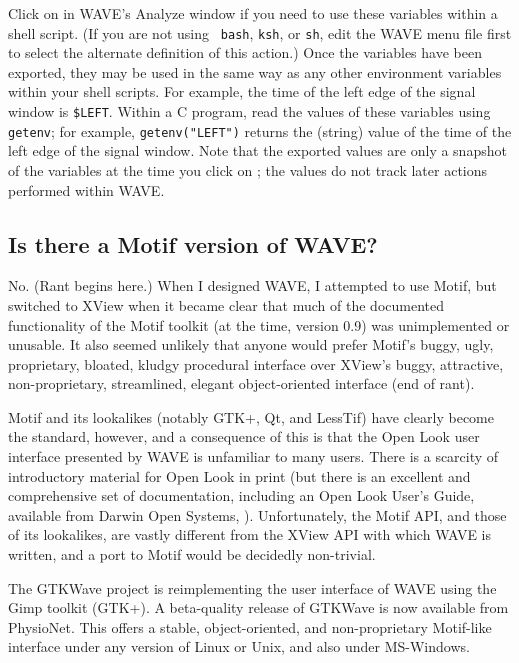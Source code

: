 \documentclass[twoside]{book}
\newcommand{\button}[1]{\cornersize{2}\ovalbox{\rule[-.3mm]{0cm}{2.5mm}\small\sf ~#1~}}
\newcommand{\WAVE}{{\sf WAVE}\xspace}
\begin{document}
Click on \button{Export variables} in \WAVE{}'s {\sf Analyze} window if you
need to use these variables within a shell script.  (If you are not using {\tt
bash}, {\tt ksh}, or {\tt sh}, edit the \WAVE{} menu file first to select the
alternate definition of this action.)  Once the variables have been exported,
they may be used in the same way as any other environment variables within your
shell scripts.  For example, the time of the left edge of the signal window is
{\tt \$LEFT}.  Within a C program, read the values of these variables using
{\tt getenv}; for example, {\tt getenv("LEFT")} returns the (string) value of
the time of the left edge of the signal window.  Note that the exported values
are only a snapshot of the variables at the time you click on \button{Export
variables}; the values do not track later actions performed within \WAVE{}.

\subsection{Is there a Motif version of \WAVE{}?}

No.  (Rant begins here.)  When I designed \WAVE{}, I attempted to use
Motif, but switched to XView when it became clear that much of the
documented functionality of the Motif toolkit (at the time, version
0.9) was unimplemented or unusable.  It also seemed unlikely that
anyone would prefer Motif's buggy, ugly, proprietary, bloated, kludgy
procedural interface over XView's buggy, attractive, non-proprietary,
streamlined, elegant object-oriented interface (end of rant).

Motif and its lookalikes (notably GTK+, Qt, and LessTif) have clearly become
the standard, however, and a consequence of this is that the Open Look user
interface presented by \WAVE{} is unfamiliar to many users.  There is a
scarcity of introductory material for Open Look in print (but there is an
excellent and comprehensive set of documentation, including an Open Look User's
Guide, available from Darwin Open Systems, ).  Unfortunately, the
Motif API, and those of its lookalikes, are vastly different from the XView API
with which \WAVE{} is written, and a port to Motif would be decidedly
non-trivial.

The {\sf GTKWave} project is reimplementing the user interface of WAVE using
the Gimp toolkit (GTK+).  A beta-quality release of {\sf GTKWave} is now
available from PhysioNet.  This offers a stable, object-oriented, and
non-proprietary Motif-like interface under any version of Linux or Unix, and
also under MS-Windows.
\end{document}
